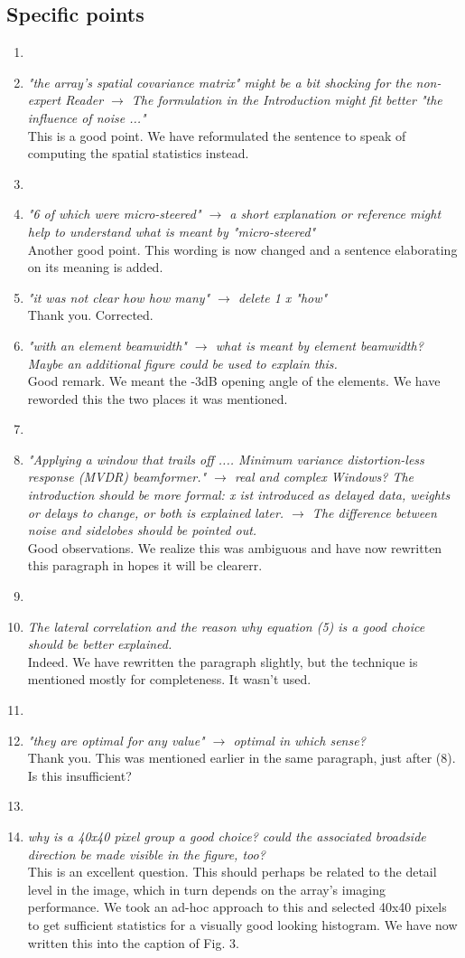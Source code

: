 \documentclass[11pt]{article} %
\newcommand\1{\vec 1}
\newcommand\q[1]{\textit{#1}}
\newcommand\qi[1]{\item\q{#1}}
\newcommand\hi[1]{\item[\textbf{#1}]}
\newcommand\ans[1]{#1}
\newcommand\ai[1]{\\[.5\baselineskip]\ans{#1}}
\begin{document}
\subsection*{Specific points}

\begin{enumerate}
\hi{Abstract}
\qi{"the array's spatial covariance matrix" might be a bit shocking for the non-expert Reader $\rightarrow$ The formulation in the Introduction might fit better "the influence of noise ..."}
\ai{This is a good point. We have reformulated the sentence to speak of computing the spatial statistics instead.}
%
\hi{Page 2}
\qi{"6 of which were micro-steered" $\rightarrow$ a short explanation or reference might help to understand what is meant by "micro-steered"}
\ai{Another good point. This wording is now changed and a sentence elaborating on its meaning is added.}
%
\qi{"it was not clear how how many" $\rightarrow$ delete 1 x "how"}
\ai{Thank you. Corrected.}
%
\qi{"with an element beamwidth" $\rightarrow$ what is meant by element beamwidth? Maybe an additional figure could be used to explain this.}
\ai{Good remark. We meant the -3dB opening angle of the elements. We have reworded this the two places it was mentioned.}
%
\hi{Page 3, after (1)}
\qi{"Applying a window that trails off .... Minimum variance distortion-less response (MVDR) beamformer." $\rightarrow$ real and complex Windows? The introduction should be more formal: x ist introduced as delayed data, weights or delays to change, or both is explained later. $\rightarrow$ The difference between noise and sidelobes should be pointed out.}
\ai{Good observations. We realize this was ambiguous and have now rewritten this paragraph in hopes it will be clearerr.}
%
\hi{Page 5, equation (5)}
\qi{The lateral correlation and the reason why equation (5) is a good choice should be better explained.}
\ai{Indeed. We have rewritten the paragraph slightly, but the technique is mentioned mostly for completeness. It wasn't used.}
%
\hi{Page 6, last row}
\qi{"they are optimal for any value" $\rightarrow$ optimal in which sense?}
\ai{Thank you. This was mentioned earlier in the same paragraph, just after (8). Is this insufficient?}
%
\hi{Fig 3}
\qi{why is a 40x40 pixel group a good choice? could the associated broadside direction be made visible in the figure, too?}
\ai{This is an excellent question. This should perhaps be related to the detail level in the image, which in turn depends on the array's imaging performance. We took an ad-hoc approach to this and selected 40x40 pixels to get sufficient statistics for a visually good looking histogram. We have now written this into the caption of Fig. 3.}

\end{enumerate}
\end{document}

